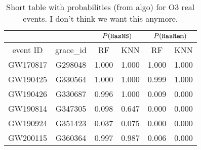 \begin{table}[]
\begin{tabular}{c|c|cc|cc}
\hline
\multicolumn{1}{c|}{}         & \multicolumn{1}{l|}{} & \multicolumn{2}{c|}{$P({{\tt HasNS}})$}                                                & \multicolumn{2}{c}{$P({{\tt HasRem}})$}                                                \\ \hline
\multicolumn{1}{c|}{event ID} & grace\_id             & \multicolumn{1}{c}{RF} & \multicolumn{1}{c}{KNN}  & \multicolumn{1}{c}{RF} & \multicolumn{1}{c}{KNN} \\ \hline
GW170817                      & G298048               & 1.000                   & 1.000                    & 1.000                   & 1.000                                  \\
GW190425                      & G330564               & 1.000                   & 1.000                    & 0.999                   & 1.000                             \\
GW190426                      & G330687               & 0.996                   & 1.000                    & 0.009                   & 0.000                     \\
GW190814                      & G347305               & 0.098                   & 0.647                    & 0.000                   & 0.000                      \\
GW190924                      & G351423               & 0.037                   & 0.075                    & 0.000                   & 0.000                       \\               
GW200115                      & G360364               & 0.997                   & 0.987                   & 0.006                   & 0.000                           \\
\hline
\end{tabular}
\caption{Short table with probabilities (from algo) for O3 real events. I don't think we want this anymore. }
\label{tab:real_data_short}
\end{table}


